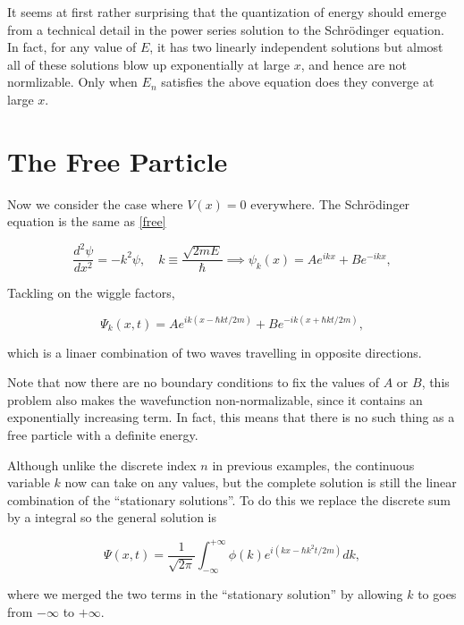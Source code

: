 \documentclass[a4paper,12pt]{report}
\begin{document}
It seems at first rather surprising that the quantization of energy should emerge from a technical detail in the power series solution to the Schrödinger equation. In fact, for any value of \(E\), it has two linearly independent solutions but almost all of these solutions blow up exponentially at large \(x\), and hence are not normlizable. Only when \(E_{n}\) satisfies the above equation does they converge at large \(x\).   

\section{The Free Particle}

Now we consider the case where \(V(x) = 0\) everywhere. The Schrödinger equation is the same as \cref{free}

\begin{equation}
  \frac{d^2\psi }{dx^2} = -k^2 \psi , \quad k \equiv \frac{\sqrt{2mE} }{\hbar } \implies \psi _{k} (x) = Ae^{ikx} + Be^{-ikx}, \label{freee} 
\end{equation}

Tackling on the wiggle factors, 

\begin{equation}
  \Psi _{k} (x,t) = Ae^{ik (x - \hbar kt/2m)} + Be^{-ik (x+ \hbar kt /2m)},
\end{equation}

which is a linaer combination of two waves travelling in opposite directions.

Note that now there are no boundary conditions to fix the values of \(A \text { or } B\), this problem also makes the wavefunction non-normalizable, since it contains an exponentially increasing term. In fact, this means that there is no such thing as a free particle with a definite energy.  

Although unlike the discrete index \(n\) in previous examples, the continuous variable \(k\) now can take on any values, but the complete solution is still the linear combination of the ``stationary solutions''. To do this we replace the discrete sum by a integral so the general solution is 

\begin{equation}
  \Psi (x,t) = \frac{1}{\sqrt{2\pi } } \int_{-\infty}^{+\infty} \phi (k) e^{i(kx - \hbar k^2 t/2m)}dk,   
\end{equation}

where we merged the two terms in the ``stationary solution'' by allowing \(k\) to goes from \(-\infty\) to \(+\infty\). 
\end{document}

